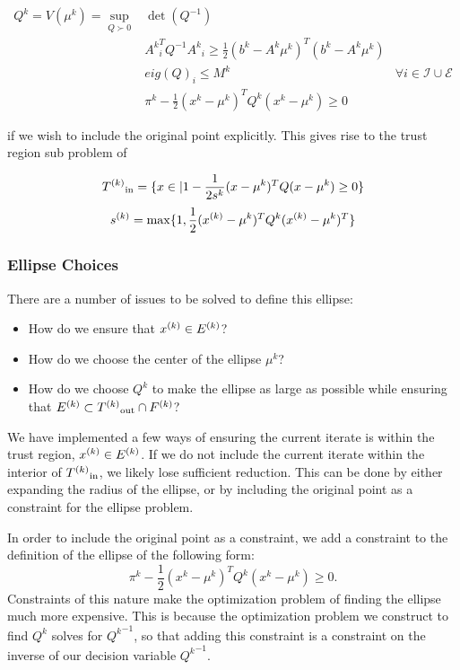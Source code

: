 \begin{center}
\begin{align}
\label{ellipse_1}
Q^k = V(\mu^k) = \sup_{Q \succ 0} & \det(Q^{-1}) & \\
  & {A^k}_i^T Q^{-1} {A^k}_i \ge \frac 1 2 (b^k - A^k\mu^{k})^T(b^k - A^k \mu^{k}) & \\
  & eig(Q)_i \le M^k & \forall i \in \mathcal I \cup \mathcal E \\
  & \pi^k - \frac 1 2 (x^k - \mu^{k})^TQ^{k}(x^k - \mu^{k}) \ge 0
\end{align}
\end{center}

if we wish to include the original point explicitly.
This gives rise to the trust region sub problem of

$${T^{(k)}}_{\text{in}} = \{x \in \mathbb | 1 - \frac 1 {2s^k} (x - \mu^{k})^T Q (x - \mu^{k}) \ge 0\} $$
$${s}^{(k)} = \max \{1, \frac 1 {2} ({x}^{(k)} - \mu^{k})^T Q^k ({x}^{(k)} - \mu^{k})^T \}$$


\subsubsection{Ellipse Choices}

There are a number of issues to be solved to define this ellipse:
\begin{itemize}
\item How do we ensure that ${x}^{(k)} \in {E^{(k)}}$?
\item How do we choose the center of the ellipse $\mu^k$?
\item How do we choose $Q^{k}$ to make the  ellipse as large as possible while ensuring that $ {E^{(k)}} \subset {T^{(k)}}_{\text{out}} \cap {F}^{(k)}$?
\end{itemize}

We have implemented a few ways of ensuring the current iterate is within the trust region, ${x}^{(k)} \in {E^{(k)}}$.
If we do not include the current iterate within the interior of ${T^{(k)}}_{\text{in}}$, we likely lose sufficient reduction.
This can be done by either expanding the radius of the ellipse, or by including the original point as a constraint for the ellipse problem.


In order to include the original point as a constraint, we add a constraint to the definition of the ellipse of the following form:
$$ \pi^k - \frac 1 2 (x^k - \mu^{k})^TQ^{k}(x^k - \mu^{k}) \ge 0. $$
Constraints of this nature make the optimization problem of finding the ellipse much more expensive.
This is because the optimization problem we construct to find $Q^k$ solves for ${Q^k}^{-1}$, so that adding this constraint is a constraint on the inverse of our decision variable ${Q^{k}}^{-1}$.


